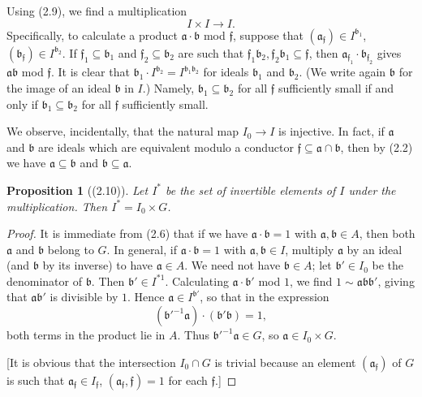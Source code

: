 \documentclass[12pt,a4paper]{article}
\theoremstyle{plain}
\newtheorem{proposition}[theorem]{Proposition}
\theoremstyle{definition}
\newcommand{\ff}{\mathfrak{f}}
\begin{document}
Using (2.9), we find a multiplication
\[
I\times I\to I.
\]
Specifically, to calculate a product $\mathfrak{a}\cdot\mathfrak{b}$ mod $\ff$, suppose that $(\mathfrak{a}_{\ff})\in I^{\mathfrak{b}_1}$, $(\mathfrak{b}_{\ff})\in I^{\mathfrak{b}_2}$. If $\ff_1\subseteq\mathfrak{b}_1$ and $\ff_2\subseteq\mathfrak{b}_2$ are such that $\ff_1\mathfrak{b}_2,\ff_2\mathfrak{b}_1\subseteq\ff$, then $\mathfrak{a}_{\ff_1}\cdot\mathfrak{b}_{\ff_2}$ gives $\mathfrak{a}\mathfrak{b}$ mod $\ff$. It is clear that $\mathfrak{b}_1\cdot I^{\mathfrak{b}_2}=I^{\mathfrak{b}_1\mathfrak{b}_2}$ for ideals $\mathfrak{b}_1$ and $\mathfrak{b}_2$. (We write again $\mathfrak{b}$ for the image of an ideal $\mathfrak{b}$ in $I$.) Namely, $\mathfrak{b}_1\subseteq\mathfrak{b}_2$ for all $\ff$ sufficiently small if and only if $\mathfrak{b}_1\subseteq\mathfrak{b}_2$ for all $\ff$ sufficiently small.

We observe, incidentally, that the natural map $I_0\to I$ is injective. In fact, if $\mathfrak{a}$ and $\mathfrak{b}$ are ideals which are equivalent modulo a conductor $\ff\subseteq\mathfrak{a}\cap\mathfrak{b}$, then by (2.2) we have $\mathfrak{a}\subseteq\mathfrak{b}$ and $\mathfrak{b}\subseteq\mathfrak{a}$.

\begin{proposition}[(2.10)]\label{prop:invertible}
Let $I^*$ be the set of invertible elements of $I$ under the multiplication. Then $I^*=I_0\times G$.
\end{proposition}

\begin{proof}
It is immediate from (2.6) that if we have $\mathfrak{a}\cdot\mathfrak{b}=1$ with $\mathfrak{a},\mathfrak{b}\in A$, then both $\mathfrak{a}$ and $\mathfrak{b}$ belong to $G$. In general, if $\mathfrak{a}\cdot\mathfrak{b}=1$ with $\mathfrak{a},\mathfrak{b}\in I$, multiply $\mathfrak{a}$ by an ideal (and $\mathfrak{b}$ by its inverse) to have $\mathfrak{a}\in A$. We need not have $\mathfrak{b}\in A$; let $\mathfrak{b}'\in I_0$ be the denominator of $\mathfrak{b}$. Then $\mathfrak{b}'\in I^{*1}$. Calculating $\mathfrak{a}\cdot\mathfrak{b}'$ mod $1$, we find $1\sim\mathfrak{a}\mathfrak{b}\mathfrak{b}'$, giving that $\mathfrak{a}\mathfrak{b}'$ is divisible by $1$. Hence $\mathfrak{a}\in I^{\mathfrak{b}'}$, so that in the expression
\[
(\mathfrak{b}'^{-1}\mathfrak{a})\cdot(\mathfrak{b}'\mathfrak{b})=1,
\]
both terms in the product lie in $A$. Thus $\mathfrak{b}'^{-1}\mathfrak{a}\in G$, so $\mathfrak{a}\in I_0\times G$.

[It is obvious that the intersection $I_0\cap G$ is trivial because an element $(\mathfrak{a}_{\ff})$ of $G$ is such that $\mathfrak{a}_{\ff}\in I_{\ff}$, $(\mathfrak{a}_{\ff},\ff)=1$ for each $\ff$.]
\end{proof}
\end{document}
